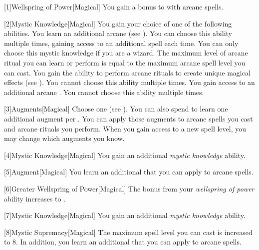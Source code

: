         [1]{Wellspring of Power}[Magical]
        You gain a  bonus to  with arcane spells.

        [2]{Mystic Knowledge}[Magical]
        You gain your choice of one of the following abilities.
        {
             You learn an additional arcane  (see ).
                You can choose this ability multiple times, gaining access to an additional spell each time.
             You can only choose this mystic knowledge if you are a wizard.
                The maximum level of arcane ritual you can learn or perform is equal to the maximum arcane spell level you can cast.
                You gain the ability to perform arcane rituals to create unique magical effects (see ).
                You cannot choose this ability multiple times.
             You gain access to an additional arcane .
                You cannot choose this ability multiple times.
        }

        [3]{Augments}[Magical]
        Choose one  (see ).
        You can also spend  to learn one additional augment per .
        You can apply those augments to arcane spells you cast and arcane rituals you perform.
        When you gain access to a new spell level, you may change which augments you know.

        [4]{Mystic Knowledge}[Magical]
        You gain an additional \textit{mystic knowledge} ability.

        [5]{Augment}[Magical]
        You learn an additional  that you can apply to arcane spells.

        [6]{Greater Wellspring of Power}[Magical]
        The bonus from your \textit{wellspring of power} ability increases to .

        [7]{Mystic Knowledge}[Magical]
        You gain an additional \textit{mystic knowledge} ability.

        [8]{Mystic Supremacy}[Magical]
        The maximum spell level you can cast is increased to 8.
        In addition, you learn an additional  that you can apply to arcane spells.

\newpage
